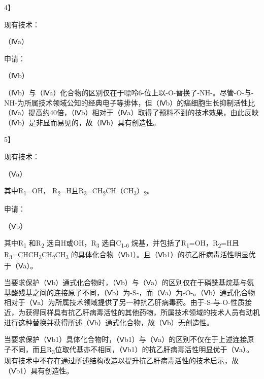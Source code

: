 {4】\par}

现有技术：

{\setlength{\parindent}{17.1bp}（Ⅳa）\par}

申请：

{\setlength{\parindent}{17.1bp}（Ⅳb）\par}

{\setlength{\parindent}{17.1bp}（Ⅳb）与（Ⅳa）化合物的区别仅在于嘌呤6-位上以-O-替换了-NH-。尽管-O-与-NH-为所属技术领域公知的经典电子等排体，但（Ⅳb）的癌细胞生长抑制活性比（Ⅳa）提高约40倍，（Ⅳb）相对于（Ⅳa）取得了预料不到的技术效果，由此反映（Ⅳb）是非显而易见的，故（Ⅳb）具有创造性。\par}

{5】\par}

现有技术：

{\setlength{\parindent}{17.1bp}（Ⅴa）\par}

其中R\textsubscript{1}=OH， R\textsubscript{2}=H且R\textsubscript{3}=CH\textsubscript{2}CH（CH\textsubscript{3}）\textsubscript{2}。

申请：

{\setlength{\parindent}{17.1bp}（Ⅴb）\par}

其中R\textsubscript{1} 和R\textsubscript{2} 选自H或OH，R\textsubscript{3} 选自C\textsubscript{1-6} 烷基，并包括了R\textsubscript{1}=OH，R\textsubscript{2}=H且R\textsubscript{3}=CHCH\textsubscript{3}CH\textsubscript{2}CH\textsubscript{3} 的具体化合物（Ⅴb1）。且（Ⅴb1）的抗乙肝病毒活性明显优于（Ⅴa）。

当要求保护（Ⅴb）通式化合物时，（Ⅴb）与（Ⅴa）的区别仅在于磷酰基烷基与氨基酸残基之间的连接原子不同，（Ⅴb）为-S-，而（Ⅴa）为-O-。（Ⅴb）通式化合物相对于（Ⅴa）为所属技术领域提供了另一种抗乙肝病毒药。由于-S-与-O-性质接近，为获得同样具有抗乙肝病毒活性的其他药物，所属技术领域的技术人员有动机进行这种替换并获得所述（Ⅴb）通式化合物，故（Ⅴb）无创造性。

当要求保护（Ⅴb1）具体化合物时，（Ⅴb1）与（Ⅴa）的区别不仅在于上述连接原子不同，而且R\textsubscript{3}位取代基亦不相同，（Ⅴb1）的抗乙肝病毒活性明显优于（Ⅴa）。现有技术中不存在通过所述结构改造以提升抗乙肝病毒活性的技术启示，故（Ⅴb1）具有创造性。

